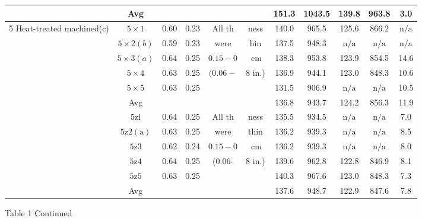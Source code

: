 \documentclass[10pt]{article}
\begin{document}
\begin{center}
\begin{tabular}{|c|c|c|c|c|c|c|c|c|c|c|}
\hline
 & Avg &  &  &  &  & 151.3 & 1043.5 & 139.8 & 963.8 & 3.0 \\
\hline
\multirow[t]{12}{*}{5 Heat-treated machined(c)} & $5 \times 1$ & 0.60 & 0.23 & All th & ness & 140.0 & 965.5 & 125.6 & 866.2 & $\mathrm{n} / \mathrm{a}$ \\
\hline
 & $5 \times 2(b)$ & 0.59 & 0.23 & were & hin & 137.5 & 948.3 & $\mathrm{n} / \mathrm{a}$ & $\mathrm{n} / \mathrm{a}$ & $\mathrm{n} / \mathrm{a}$ \\
\hline
 & $5 \times 3(a)$ & 0.64 & 0.25 & $0.15-0$ & $\mathrm{~cm}$ & 138.3 & 953.8 & 123.9 & 854.5 & 14.6 \\
\hline
 & $5 \times 4$ & 0.63 & 0.25 & $(0.06-$ & 8 in.) & 136.9 & 944.1 & 123.0 & 848.3 & 10.6 \\
\hline
 & $5 \times 5$ & 0.63 & 0.25 &  &  & 131.5 & 906.9 & $\mathrm{n} / \mathrm{a}$ & $\mathrm{n} / \mathrm{a}$ & 10.5 \\
\hline
 & Avg &  &  &  &  & 136.8 & 943.7 & 124.2 & 856.3 & 11.9 \\
\hline
 & $5 \mathrm{zl}$ & 0.64 & 0.25 & All th & ness & 135.5 & 934.5 & $\mathrm{n} / \mathrm{a}$ & $\mathrm{n} / \mathrm{a}$ & 7.0 \\
\hline
 & $5 \mathrm{z} 2(\mathrm{a})$ & 0.63 & 0.25 & were & thin & 136.2 & 939.3 & $\mathrm{n} / \mathrm{a}$ & $\mathrm{n} / \mathrm{a}$ & 8.5 \\
\hline
 & $5 \mathrm{z} 3$ & 0.62 & 0.24 & $0.15-0$ & $\mathrm{~cm}$ & 136.2 & 939.3 & $\mathrm{n} / \mathrm{a}$ & $\mathrm{n} / \mathrm{a}$ & 8.0 \\
\hline
 & $5 \mathrm{z} 4$ & 0.64 & 0.25 & (0.06- & 8 in.) & 139.6 & 962.8 & 122.8 & 846.9 & 8.1 \\
\hline
 & $5 \mathrm{z} 5$ & 0.63 & 0.25 &  &  & 140.3 & 967.6 & 123.0 & 848.3 & 7.3 \\
\hline
 & Avg &  &  &  &  & 137.6 & 948.7 & 122.9 & 847.6 & 7.8 \\
\hline
\end{tabular}
\end{center}

Table 1 Continued
\end{document}
